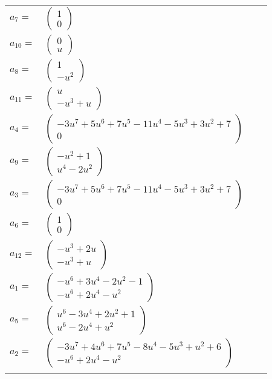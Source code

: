 \documentclass[1p]{elsarticle_modified}
\theoremstyle{definition}
\begin{document}
\begin{tabular}{m{7pt} m{180pt} m{7pt} m{180pt} }
\flushright $a_{7}=$&$\begin{pmatrix}1\\0\end{pmatrix}$ \\
\flushright $a_{10}=$&$\begin{pmatrix}0\\u\end{pmatrix}$ \\
\flushright $a_{8}=$&$\begin{pmatrix}1\\- u^2\end{pmatrix}$ \\
\flushright $a_{11}=$&$\begin{pmatrix}u\\- u^3+u\end{pmatrix}$ \\
\flushright $a_{4}=$&$\begin{pmatrix}-3 u^7+5 u^6+7 u^5-11 u^4-5 u^3+3 u^2+7\\0\end{pmatrix}$ \\
\flushright $a_{9}=$&$\begin{pmatrix}- u^2+1\\u^4-2 u^2\end{pmatrix}$ \\
\flushright $a_{3}=$&$\begin{pmatrix}-3 u^7+5 u^6+7 u^5-11 u^4-5 u^3+3 u^2+7\\0\end{pmatrix}$ \\
\flushright $a_{6}=$&$\begin{pmatrix}1\\0\end{pmatrix}$ \\
\flushright $a_{12}=$&$\begin{pmatrix}- u^3+2 u\\- u^3+u\end{pmatrix}$ \\
\flushright $a_{1}=$&$\begin{pmatrix}- u^6+3 u^4-2 u^2-1\\- u^6+2 u^4- u^2\end{pmatrix}$ \\
\flushright $a_{5}=$&$\begin{pmatrix}u^6-3 u^4+2 u^2+1\\u^6-2 u^4+u^2\end{pmatrix}$ \\
\flushright $a_{2}=$&$\begin{pmatrix}-3 u^7+4 u^6+7 u^5-8 u^4-5 u^3+u^2+6\\- u^6+2 u^4- u^2\end{pmatrix}$\\&\end{tabular}
\end{document}
